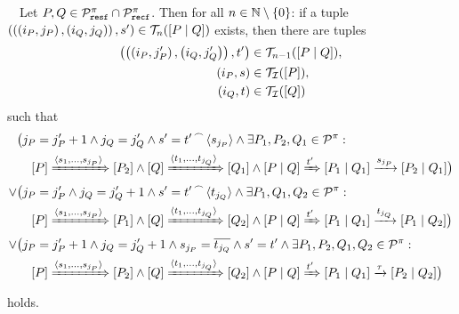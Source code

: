 \begin{lemma}
\label{lem_idx_trace_sets}
$\quad$\newline{}Let $P,Q\in\mathcal P^{\pi}_{\mathtt{resf}}\cap\mathcal P^{\pi}_{\mathtt{recf}}$. Then for all $n\in\N\setminus\set{0}$:\newline
\newline
if a tuple $\left(\left(\left(i_P,j_P\right),\left(i_Q,j_Q\right)\right),s'\right)\in\mathcal T_{n}(\left[P \mid Q\right])$ exists, then there are tuples
\begin{align*}
  \left(\left(\left(i_P,j_P'\right),\left(i_Q,j_Q'\right)\right),t'\right)&\in\mathcal T_{n-1}(\left[P \mid Q\right]), \\
  \left(i_P,s\right)&\in\mathcal{T_I}(\left[P\right]),\\
  \left(i_Q,t\right)&\in\mathcal{T_I}(\left[Q\right])
\end{align*}
such that
\begin{align*}
	&\bigl(j_P=j_P'+1\wedge j_Q=j_Q'\wedge s'={t'}^{\,\frown{}\,}{\langle s_{j_P}\rangle}\wedge\exists P_1,P_2,Q_1\in\mathcal P^{\pi}: \\
 &\quad\left[P\right]\xRightarrow{\langle s_1,\ldots,s_{j_P}\rangle}\left[P_2\right]\wedge \left[Q\right]\xRightarrow{\langle t_1,\ldots,t_{j_Q}\rangle}\left[Q_1\right]\wedge\left[P \mid Q\right]\xRightarrow{t'}\left[P_1 \mid Q_1\right]\xrightarrow{s_{j_P}}\left[P_2 \mid Q_1\right]\bigr) \\
	\vee&  \bigl(j_P=j_P'\wedge j_Q=j_Q'+1\wedge s'={t'}^{\,\frown{}\,}{\langle t_{j_Q}\rangle}\wedge\exists P_1,Q_1,Q_2\in\mathcal P^{\pi}:\\
&\quad \left[P\right]\xRightarrow{\langle s_1,\ldots,s_{j_P}\rangle}\left[P_1\right]\wedge \left[Q\right]\xRightarrow{\langle t_1,\ldots,t_{j_Q}\rangle}\left[Q_2\right]\wedge\left[P \mid Q\right]\xRightarrow{t'}\left[P_1 \mid Q_1\right]\xrightarrow{t_{j_Q}}\left[P_1 \mid Q_2\right] \bigr) \\
	\vee&  \bigl(j_P=j_P'+1\wedge j_Q=j_Q'+1\wedge s_{j_P}=\overline{t_{j_Q}}\wedge s'=t'\wedge\exists P_1,P_2,Q_1,Q_2\in\mathcal P^{\pi}: \\
&\quad \left[P\right]\xRightarrow{\langle s_1,\ldots,s_{j_P}\rangle}\left[P_2\right]\wedge \left[Q\right]\xRightarrow{\langle t_1,\ldots,t_{j_Q}\rangle}\left[Q_2\right]\wedge \left[P \mid Q\right]\xRightarrow{t'}\left[P_1 \mid Q_1\right]\xrightarrow{\tau}\left[P_2 \mid Q_2\right]\bigr)
\end{align*}
holds.
\end{lemma}
